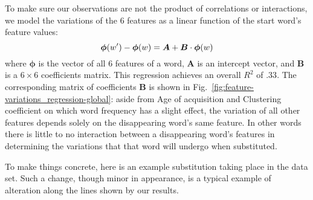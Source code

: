 \begin{new}

To make sure our observations are not the product of correlations or interactions, we model the variations of the 6 features as a linear function of the start word's feature values:
$$\bm{\phi}(\warrival) - \bm{\phi}(\wstart) = \bm{A} +  \bm{B} \cdot \bm{\phi}(\wstart)$$
where $\bm{\phi}$ is the vector of all 6 features of a word, $\bm{A}$ is an intercept vector, and $\bm{B}$ is a $6 \times 6$ coefficients matrix.
This regression achieves an overall $R^2$ of $.33$.
The corresponding matrix of coefficients $\bm{B}$ is shown in Fig.~\ref{fig:feature-variations_regression-global}:
aside from Age of acquisition and Clustering coefficient on which word frequency has a slight effect, the variation of all other features depends solely on the disappearing word's same feature.
In other words there is little to no interaction between a disappearing word's features in determining the variations that that word will undergo when substituted.

\end{new}


To make things concrete, here is an example substitution taking place in the data set.
Such a change, though minor in appearance, is a typical example of alteration along the lines shown by our results.


